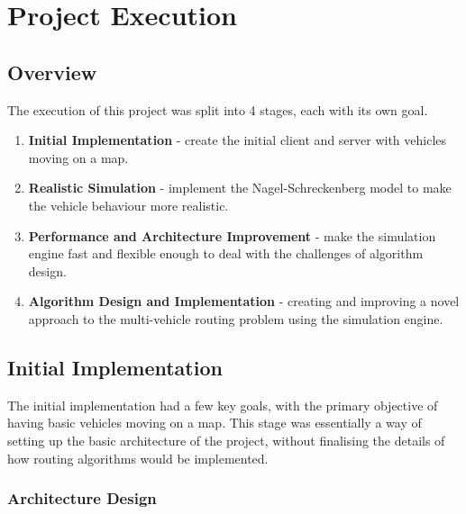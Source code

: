 \documentclass[ %
                    author={Alexander Hill},
                supervisor={Dr. Benjamin Sach},
                    degree={MEng},
                     title={MARMOSET},
                  subtitle={Multi-Agent Route Management using Online Simulation for Efficient Transportation},
                      type={research},
                      year={2016} ]{dissertation}
\begin{document}

\chapter{Project Execution}
\label{chap:execution}

\section{Overview}

The execution of this project was split into 4 stages, each with its own goal.

\begin{enumerate}
    \item \textbf{Initial Implementation} - create the initial client and
        server with vehicles moving on a map.
    \item \textbf{Realistic Simulation} - implement the Nagel-Schreckenberg
        model to make the vehicle behaviour more realistic.
    \item \textbf{Performance and Architecture Improvement} - make the
        simulation engine fast and flexible enough to deal with the challenges
        of algorithm design.
    \item \textbf{Algorithm Design and Implementation} - creating and improving
        a novel approach to the multi-vehicle routing problem using the
        simulation engine.
\end{enumerate}

\section{Initial Implementation}

The initial implementation had a few key goals, with the primary objective of
having basic vehicles moving on a map. This stage was essentially a way of
setting up the basic architecture of the project, without finalising the
details of how routing algorithms would be implemented.

\subsection{Architecture Design}
\end{document}
